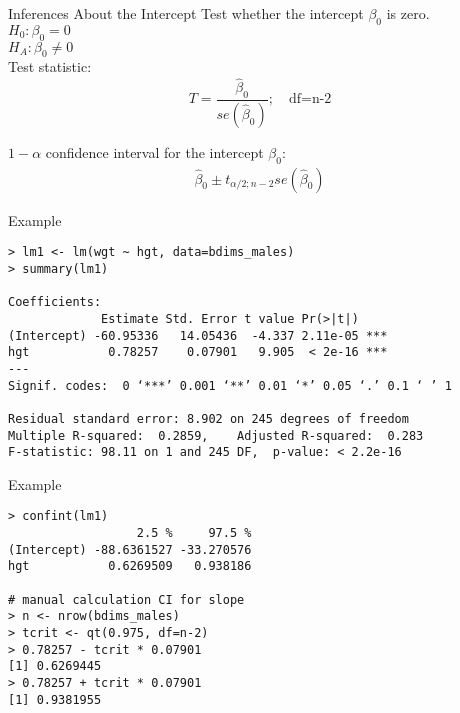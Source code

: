 \documentclass[10pt]{beamer}
\begin{document}
\begin{frame}{Inferences About the Intercept}
Test whether the intercept $\beta_0$ is zero.\\
\vspace{10pt}
$H_0: \beta_0 = 0$\\
$H_A: \beta_0 \neq 0$\\
\vspace{10pt}
Test statistic:
$$T = \frac{\hat{\beta}_0}{se(\hat{\beta}_0)}; \quad \text{df=n-2}$$
\vspace{15pt}

$1-\alpha$ confidence interval for the intercept $\beta_0$:
\begin{align*}
\hat{\beta}_0 \pm t_{\alpha/2; n-2} se(\hat{\beta}_0)
\end{align*}
\end{frame}

\begin{frame}[fragile]{Example}
\small
\begin{verbatim}
> lm1 <- lm(wgt ~ hgt, data=bdims_males)
> summary(lm1)

Coefficients:
             Estimate Std. Error t value Pr(>|t|)    
(Intercept) -60.95336   14.05436  -4.337 2.11e-05 ***
hgt           0.78257    0.07901   9.905  < 2e-16 ***
---
Signif. codes:  0 ‘***’ 0.001 ‘**’ 0.01 ‘*’ 0.05 ‘.’ 0.1 ‘ ’ 1

Residual standard error: 8.902 on 245 degrees of freedom
Multiple R-squared:  0.2859,	Adjusted R-squared:  0.283 
F-statistic: 98.11 on 1 and 245 DF,  p-value: < 2.2e-16
\end{verbatim}
\end{frame}


\begin{frame}[fragile]{Example}
\begin{verbatim}
> confint(lm1)
                  2.5 %     97.5 %
(Intercept) -88.6361527 -33.270576
hgt           0.6269509   0.938186

# manual calculation CI for slope 
> n <- nrow(bdims_males)
> tcrit <- qt(0.975, df=n-2)
> 0.78257 - tcrit * 0.07901
[1] 0.6269445
> 0.78257 + tcrit * 0.07901
[1] 0.9381955
\end{verbatim}
\end{frame}
\end{document}
